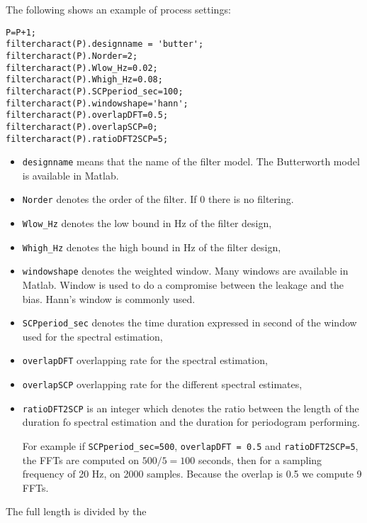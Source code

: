 The following shows an example of  process settings:
\begin{center}
\small
\begin{verbatim}
P=P+1;
filtercharact(P).designname = 'butter';
filtercharact(P).Norder=2;
filtercharact(P).Wlow_Hz=0.02;
filtercharact(P).Whigh_Hz=0.08;
filtercharact(P).SCPperiod_sec=100;
filtercharact(P).windowshape='hann';
filtercharact(P).overlapDFT=0.5;
filtercharact(P).overlapSCP=0;
filtercharact(P).ratioDFT2SCP=5;
\end{verbatim}
\end{center}
\begin{itemize}
\item
{\tt designname} means that the name of the filter model. The Butterworth model is available in Matlab. 
\item
{\tt Norder} denotes the order of the filter. If 0 there is no filtering. 
\item
{\tt Wlow\_Hz} denotes the low bound in Hz of the filter design,
\item
{\tt Whigh\_Hz} denotes the high bound in Hz of the filter design,
\item
{\tt windowshape} denotes the weighted window. Many windows are available in Matlab. Window is used to do a compromise between the leakage and the bias. Hann's window is commonly used.
\item
{\tt SCPperiod\_sec} denotes the time duration expressed in second of the window used for the spectral estimation,
\item
{\tt overlapDFT} overlapping rate for the spectral estimation,
\item
{\tt overlapSCP} overlapping rate for the different spectral estimates,
\item
{\tt ratioDFT2SCP} is an integer which denotes the ratio between the length of the duration fo spectral estimation and the duration for periodogram performing. 

For example if {\tt SCPperiod\_sec=500}, {\tt overlapDFT = 0.5} and  {\tt ratioDFT2SCP=5}, the FFTs are computed on $500/5=100$ seconds, then for a sampling frequency of 20 Hz, on 2000 samples. Because the overlap is 0.5 we compute 9 FFTs.
\end{itemize}

The full length is divided by the 


